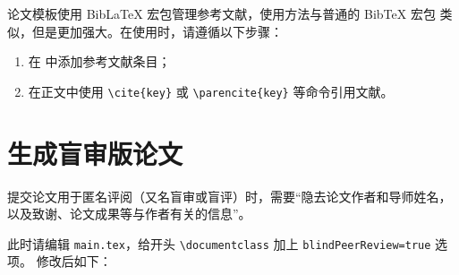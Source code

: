 \BIThesis 论文模板使用 BibLaTeX 宏包管理参考文献，使用方法与普通的 BibTeX 宏包
类似，但是更加强大。在使用时，请遵循以下步骤：
\begin{enumerate}
  \item 在 \texttt{} 中添加参考文献条目；
  \item 在正文中使用 \verb|\cite{key}| 或 \verb|\parencite{key}| 等命令引用文献。
\end{enumerate}

\section{生成盲审版论文}
\label{sec:blind}

提交论文用于匿名评阅（又名盲审或盲评）时，需要“隐去论文作者和导师姓名，以及致谢、论文成果等与作者有关的信息”。

此时请编辑 \texttt{main.tex}，给开头 \verb|\documentclass| 加上 \verb|blindPeerReview=true| 选项。
修改后如下：
\isGraduateTF{
  
}{
  
}
